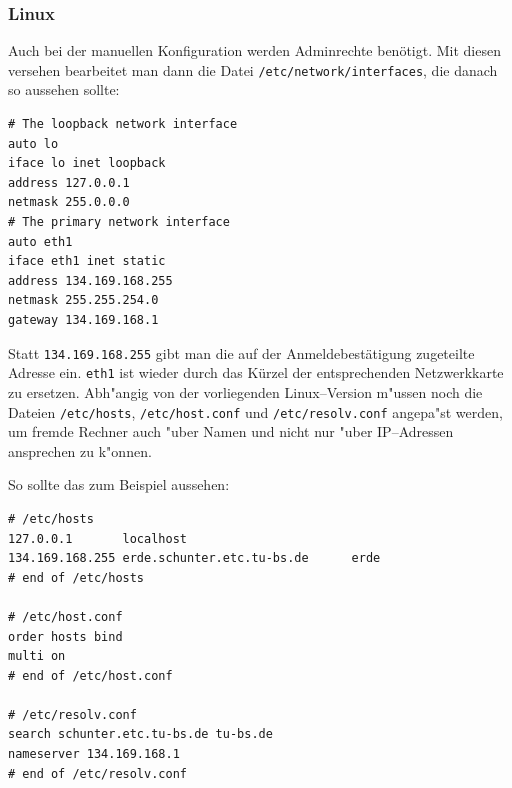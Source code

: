 



\newpage
\subsubsection{Linux}
Auch bei der manuellen Konfiguration werden Adminrechte benötigt. 
Mit diesen versehen bearbeitet man dann die Datei
\texttt{/etc/network/interfaces}, die danach so aussehen sollte:
\begin{verbatim}
# The loopback network interface
auto lo
iface lo inet loopback
address 127.0.0.1
netmask 255.0.0.0
# The primary network interface
auto eth1
iface eth1 inet static
address 134.169.168.255
netmask 255.255.254.0
gateway 134.169.168.1
\end{verbatim}
Statt \texttt{134.169.168.255} gibt man die auf der Anmeldebestätigung
zugeteilte Adresse ein. \texttt{eth1} ist wieder durch das Kürzel der
entsprechenden Netzwerkkarte zu ersetzen. 
Abh"angig von der vorliegenden \glossar Linux--Version m"ussen noch die Dateien
\texttt{/etc/hosts}, \texttt{/etc/host.conf} und \texttt{/etc/resolv.conf}
angepa"st werden, um fremde Rechner auch "uber Namen und nicht nur "uber
IP--Adressen ansprechen zu k"onnen.

So sollte das zum Beispiel aussehen: 

\begin{verbatim}
# /etc/hosts
127.0.0.1       localhost
134.169.168.255 erde.schunter.etc.tu-bs.de      erde
# end of /etc/hosts

# /etc/host.conf
order hosts bind
multi on
# end of /etc/host.conf

# /etc/resolv.conf
search schunter.etc.tu-bs.de tu-bs.de
nameserver 134.169.168.1
# end of /etc/resolv.conf
\end{verbatim}

